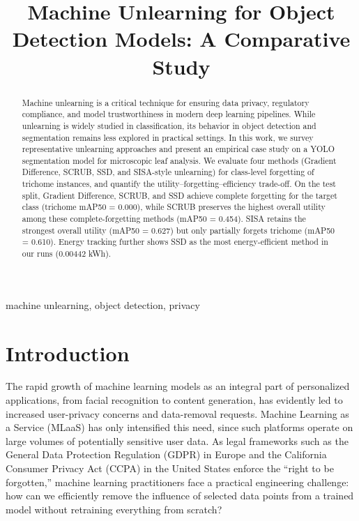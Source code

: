 \documentclass[conference]{IEEEtran}
\begin{document}
\title{Machine Unlearning for Object Detection Models: A Comparative Study\\
}

\author{
}

\maketitle

\begin{abstract}
Machine unlearning is a critical technique for ensuring data privacy, regulatory compliance, and model trustworthiness in modern deep learning pipelines. While unlearning is widely studied in classification, its behavior in object detection and segmentation remains less explored in practical settings. In this work, we survey representative unlearning approaches and present an empirical case study on a YOLO segmentation model for microscopic leaf analysis. We evaluate four methods (Gradient Difference, SCRUB, SSD, and SISA-style unlearning) for class-level forgetting of trichome instances, and quantify the utility--forgetting--efficiency trade-off. On the test split, Gradient Difference, SCRUB, and SSD achieve complete forgetting for the target class (trichome mAP50 = 0.000), while SCRUB preserves the highest overall utility among these complete-forgetting methods (mAP50 = 0.454). SISA retains the strongest overall utility (mAP50 = 0.627) but only partially forgets trichome (mAP50 = 0.610). Energy tracking further shows SSD as the most energy-efficient method in our runs (0.00442 kWh).
\end{abstract}

\begin{IEEEkeywords}
machine unlearning, object detection, privacy
\end{IEEEkeywords}

\section{\textbf{Introduction}}
The rapid growth of machine learning models as an integral part of personalized applications, from facial recognition to content generation, has evidently led to increased user-privacy concerns and data-removal requests. Machine Learning as a Service (MLaaS) has only intensified this need, since such platforms operate on large volumes of potentially sensitive user data. As legal frameworks such as the General Data Protection Regulation (GDPR) in Europe and the California Consumer Privacy Act (CCPA) in the United States enforce the ``right to be forgotten,'' machine learning practitioners face a practical engineering challenge: how can we efficiently remove the influence of selected data points from a trained model without retraining everything from scratch? \cite{cao2015,bourtoule2021}
\end{document}
